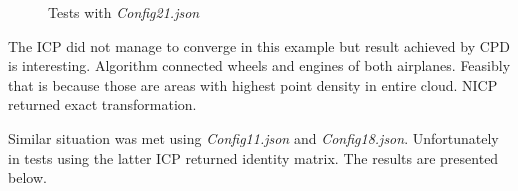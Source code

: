 \documentclass[titlepage]{article}
\begin{document}
\begin{figure}[H]
	\centering
    \hspace{0.5em}
    \hspace{0.5em}
    \caption{Tests with \textit{Config21.json}}
\end{figure}

The ICP did not manage to converge in this example but result achieved by CPD is interesting. Algorithm connected wheels and engines of both airplanes. Feasibly that is because those are areas with highest point density in entire cloud. NICP returned exact transformation.

Similar situation was met using \textit{Config11.json} and \textit{Config18.json}. Unfortunately in tests using the latter ICP returned identity matrix. The results are presented below.
\end{document}
